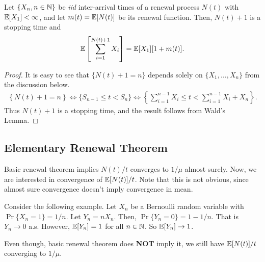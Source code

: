 \documentclass[a4paper,10pt, english]{article}
\begin{document}
\begin{prop} \label{prop:WaldRenewal}
	Let $\{X_n, n \in \mathbb{N}\}$ be \textit{iid} inter-arrival times of a renewal process $N(t)$ with $\mathbb{E}[X_1] < \infty$, and let $m(t) = \mathbb{E}[N(t)]$ be its renewal function. Then, $N(t)+1$ is a stopping time and 
	\begin{align*}
	\mathbb{E}\left[\sum_{i=1}^{N(t)+1}X_i\right] = \mathbb{E}[X_1][1+m(t)].
	\end{align*}
\end{prop}
\begin{proof} It is easy to see that $\{N(t)+1=n\}$ depends solely on $\{X_1,\ldots,X_n\}$ from the discussion below.
	\begin{align*}
	\left\{N(t) + 1 = n \right\} \iff \{S_{n-1} \leq t < S_n\} \iff \left\{\sum_{i=1}^{n-1} X_i \leq t < \sum_{i=1}^{n-1} X_i + X_n\right\}.
	\end{align*}
	Thus $N(t)+1$ is a stopping time, and the result follows from Wald's Lemma.
\end{proof}

\subsection{Elementary Renewal Theorem}
Basic renewal theorem implies $N(t)/t$ converges to $1/\mu$ almost surely. Now, we are interested in convergence of $\mathbb{E}[N(t)]/t$. Note that this is not obvious, since almost sure convergence doesn't imply convergence in mean. 
\begin{shaded*}
Consider the following example. 
Let $X_n$ be a Bernoulli random variable with $\Pr\{X_n = 1\} = 1/n$. 
Let $Y_n = nX_n$. 
Then, $\Pr\{ Y_n = 0 \} = 1 - 1/n$. %
That is $Y_n \to 0$ a.s. However, $\mathbb{E}[Y_n] = 1$ for all $n \in \mathbb{N}$. 
So $\mathbb{E}[Y_n] \to 1$.
\end{shaded*}
Even though, basic renewal theorem does \textbf{NOT} imply it, we still have $\mathbb{E}[N(t)]/t$ converging to $1/\mu$.
\end{document}
